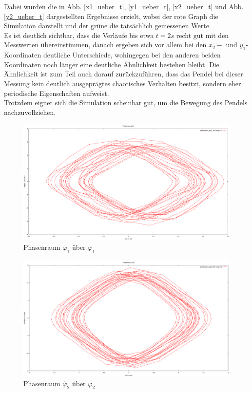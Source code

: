 Dabei wurden die in Abb. \ref{x1_ueber_t}, \ref{y1_ueber_t}, \ref{x2_ueber_t} und Abb. \ref{y2_ueber_t} dargestellten Ergebnisse erzielt, wobei der rote Graph die Simulation darstellt und der grüne die tatsächlich gemessenen Werte. \\
Es ist deutlich sichtbar, dass die Verläufe bis etwa $ t = 2 s $ recht gut mit den Messwerten übereinstimmen, danach ergeben sich vor allem bei den $x_2- $ und $ y_1$-Koordinaten deutliche Unterschiede, wohingegen bei den anderen beiden Koordinaten noch länger eine deutliche Ähnlichkeit bestehen bleibt. Die Ähnlichkeit ist zum Teil auch darauf zurückzuführen, dass das Pendel bei dieser Messung kein deutlich ausgeprägtes chaotisches Verhalten besitzt, sondern eher periodische Eigenschaften aufweist. \\
Trotzdem eignet sich die Simulation scheinbar gut, um die Bewegung des Pendels nachzuvollziehen. 

\begin{figure}
        \includegraphics[width=.9\textwidth]{images/phi1_ueberphi1.png}
\caption{Phasenraum $\dot{\varphi_1} $ über $\varphi_1$}
\label{phi1}
\end{figure}

\begin{figure}
        \includegraphics[width=.9\textwidth]{images/phi2_ueberphi2.png}
\caption{Phasenraum $\dot{\varphi_2} $ über $\varphi_2$}
\label{phi2}
\end{figure}

